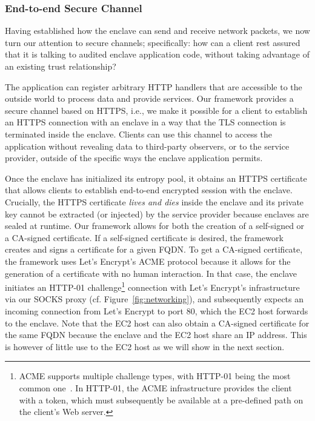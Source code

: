 \subsubsection{End-to-end Secure Channel}
\label{sec:cert}

Having established how the enclave can send and receive network packets, we now
turn our attention to secure channels; specifically: how can a client rest
assured that it is talking to audited enclave application code, without taking
advantage of an existing trust relationship?

The application can register arbitrary HTTP handlers that are accessible to the
outside world to process data and provide services.
Our framework provides a secure channel based on HTTPS, i.e., we make it
possible for a client to establish an HTTPS connection with an enclave in a way
that the TLS connection is terminated inside the enclave. Clients can use this
channel to access the application without revealing data to third-party
observers, or to the service provider, outside of the specific ways the enclave
application permits.

Once the enclave has initialized its entropy pool, it obtains an HTTPS
certificate that allows clients to establish end-to-end encrypted session with
the enclave.  Crucially, the HTTPS certificate \emph{lives and dies} inside the
enclave and its private key cannot be extracted (or injected) by the service
provider because enclaves are sealed at runtime.  Our framework allows for both
the creation of a self-signed or a CA-signed certificate.  If a self-signed
certificate is desired, the framework creates and signs a certificate for a
given FQDN.  To get a CA-signed certificate, the framework uses Let's Encrypt's
ACME protocol because it allows for the generation of a certificate with no
human interaction.  In that case, the enclave initiates an HTTP-01
challenge\footnote{ACME supports multiple challenge types, with HTTP-01 being
the most common one~\cite{http-01}.  In HTTP-01, the ACME infrastructure
provides the client with a token, which must subsequently be available at a
pre-defined path on the client's Web server.} connection with Let's Encrypt's
infrastructure via our SOCKS proxy (cf.  Figure~\ref{fig:networking}), and
subsequently expects an incoming connection from Let's Encrypt to port 80, which
the EC2 host forwards to the enclave.  Note that the EC2 host can also obtain a
CA-signed certificate for the same FQDN because the enclave and the EC2 host
share an IP address.  This is however of little use to the EC2 host as we will
show in the next section.

